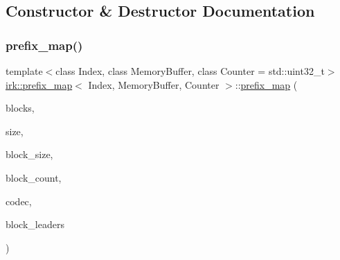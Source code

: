 \subsection{Constructor \& Destructor Documentation}
\mbox{\label{classirk_1_1prefix__map_a0460c33c17f3182b9db49b45bc366069}} 
\subsubsection{\texorpdfstring{prefix\+\_\+map()}{prefix\_map()}\hspace{0.1cm}{\footnotesize\ttfamily [1/3]}}
{\footnotesize\ttfamily template$<$class Index, class Memory\+Buffer, class Counter = std\+::uint32\+\_\+t$>$ \\
\mbox{\hyperlink{classirk_1_1prefix__map}{irk\+::prefix\+\_\+map}}$<$ Index, Memory\+Buffer, Counter $>$\+::\mbox{\hyperlink{classirk_1_1prefix__map}{prefix\+\_\+map}} (\begin{DoxyParamCaption}\item[{Memory\+Buffer}]{blocks,  }\item[{std\+::size\+\_\+t}]{size,  }\item[{std\+::size\+\_\+t}]{block\+\_\+size,  }\item[{std\+::size\+\_\+t}]{block\+\_\+count,  }\item[{const std\+::shared\+\_\+ptr$<$ \mbox{\hyperlink{classirk_1_1hutucker__codec}{irk\+::hutucker\+\_\+codec}}$<$ char $>$$>$}]{codec,  }\item[{std\+::shared\+\_\+ptr$<$ \mbox{\hyperlink{classirk_1_1radix__tree}{radix\+\_\+tree}}$<$ Index $>$$>$}]{block\+\_\+leaders }\end{DoxyParamCaption})\hspace{0.3cm}{\ttfamily [inline]}}

\mbox{\label{classirk_1_1prefix__map_a7a92eedd3b88338fe84a5980201faf87}} 

